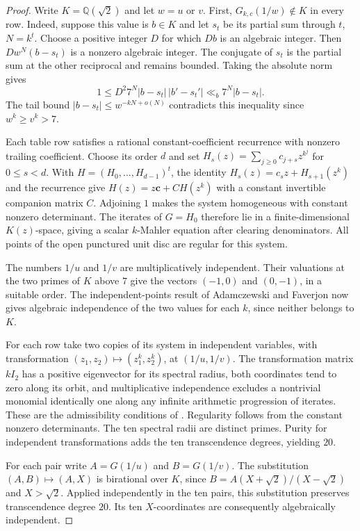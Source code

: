\documentclass[11pt,a4paper]{article}
\newcommand{\Q}{\mathbb Q}\newcommand{\Z}{\mathbb Z}\newcommand{\PP}{\mathbb P}\newcommand{\SL}{\mathrm{SL}}
\begin{document}
\begin{proof}
Write $K=\Q(\sqrt2)$ and let $w=u$ or $v$. First,
$G_{k,c}(1/w)\notin K$ in every row. Indeed, suppose this value is
$b\in K$ and let $s_t$ be its partial sum through $t$, $N=k^t$.
Choose a positive integer $D$ for which $Db$ is an algebraic integer.
Then $Dw^N(b-s_t)$ is a nonzero algebraic integer. The conjugate of
$s_t$ is the partial sum at the other reciprocal and remains bounded.
Taking the absolute norm gives
\[
  1\le D^2 7^N |b-s_t|\,|b'-s_t'|\ll_b7^N |b-s_t|.
\]
The tail bound $|b-s_t|\le w^{-kN+o(N)}$ contradicts this inequality
since $w^k\ge v^k>7$.

Each table row satisfies a rational constant-coefficient recurrence with
nonzero trailing coefficient. Choose its order $d$ and set
$H_s(z)=\sum_{j\ge0}c_{j+s}z^{k^j}$ for $0\le s<d$.
With $H=(H_0,\ldots,H_{d-1})^t$, the identity
$H_s(z)=c_s z+H_{s+1}(z^k)$ and the recurrence give
$H(z)=z\boldsymbol c+C H(z^k)$ with a constant invertible companion
matrix $C$. Adjoining $1$ makes the system homogeneous with constant
nonzero determinant. The iterates of $G=H_0$ therefore lie in a finite-dimensional
$K(z)$-space, giving a scalar $k$-Mahler equation after clearing denominators.
All points of the open punctured unit disc are regular for this system.

The numbers $1/u$ and $1/v$ are multiplicatively independent. Their valuations
at the two primes of $K$ above $7$ give the vectors $(-1,0)$ and $(0,-1)$,
in a suitable order. The independent-points result of Adamczewski and
Faverjon \cite[Thm.~1.1(i)]{af} now gives algebraic independence of the two
values for each $k$, since neither belongs to $K$.

For each row take two copies of its system in independent variables, with
transformation $(z_1,z_2)\mapsto(z_1^k,z_2^k)$, at $(1/u,1/v)$.
The transformation matrix $kI_2$ has a positive eigenvector for its
spectral radius, both coordinates tend to zero along its orbit, and
multiplicative independence excludes a nontrivial monomial identically
one along any infinite arithmetic progression of iterates.
These are the admissibility conditions of \cite[\S5]{af}.
Regularity follows from the constant nonzero determinants.
The ten spectral radii are distinct primes. Purity for independent
transformations \cite[Thm.~3.8 and Cor.~3.9]{af} adds the ten
transcendence degrees, yielding $20$.

For each pair write $A=G(1/u)$ and $B=G(1/v)$. The substitution
$(A,B)\mapsto (A,X)$ is birational over $K$, since
$B=A(X+\sqrt2)/(X-\sqrt2)$ and $X>\sqrt2$. Applied independently in
the ten pairs, this substitution preserves transcendence degree $20$.
Its ten $X$-coordinates are consequently algebraically independent.
\end{proof}
\end{document}
